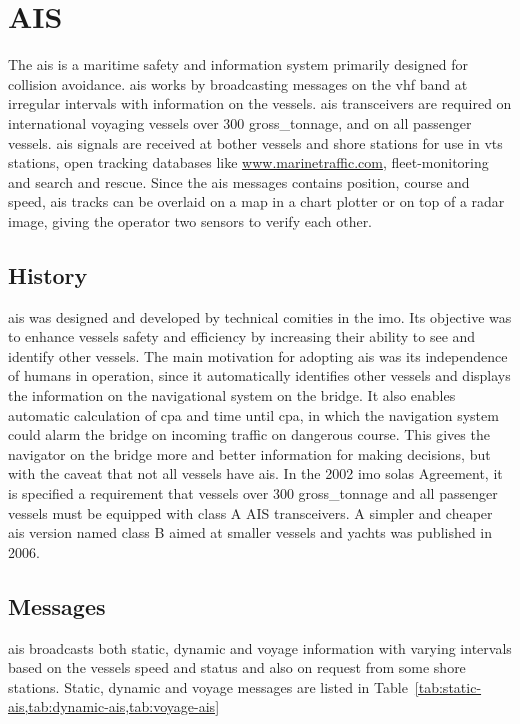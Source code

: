 \section{AIS}
The \acrfull{ais} is a maritime safety and information system primarily designed for collision avoidance. \gls{ais} works by broadcasting messages on the \gls{vhf} band at irregular intervals with information on the vessels. \gls{ais} transceivers are required on international voyaging vessels over 300 \gls{gross_tonnage}, and on all passenger vessels. \gls{ais} signals are received at bother vessels and shore stations for use in \gls{vts} stations, open tracking databases like \url{www.marinetraffic.com}, fleet-monitoring and search and rescue. Since the \gls{ais} messages contains position, course and speed, \gls{ais} tracks can be overlaid on a map in a chart plotter or on top of a radar image, giving the operator two sensors to verify each other.

\subsection{History}
\gls{ais} was designed and developed by technical comities in the \gls{imo}. Its objective was to enhance vessels safety and efficiency by increasing their ability to see and identify other vessels. The main motivation for adopting \gls{ais} was its independence of humans in operation, since it automatically identifies other vessels and displays the information on the navigational system on the bridge. It also enables automatic calculation of \gls{cpa} and time until \gls{cpa}, in which the navigation system could alarm the bridge on incoming traffic on dangerous course. This gives the navigator on the bridge more and better information for making decisions, but with the caveat that not all vessels have \gls{ais}. In the 2002 \gls{imo} \gls{solas} Agreement, it is specified a requirement that vessels over 300 \gls{gross_tonnage} and all passenger vessels must be equipped with class A AIS transceivers. A simpler and cheaper \gls{ais} version named class B aimed at smaller vessels and yachts was published in 2006. 

\subsection{Messages}
\gls{ais} broadcasts both static, dynamic and voyage information with varying intervals based on the vessels speed and status and also on request from some shore stations. Static, dynamic and voyage messages are listed in Table~\cref{tab:static-ais,tab:dynamic-ais,tab:voyage-ais}


